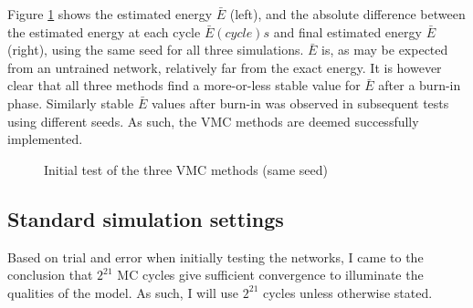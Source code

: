 \documentclass[%
oneside,                 %
final,                   %
10pt]{article}
\begin{document}
Figure \ref{fig:inital_1} shows the estimated energy $\bar E$ (left), and the absolute difference between the estimated energy at each cycle $\bar E(cycle)s$ and final estimated energy $\bar E$ (right), using the same seed for all three simulations. $\bar E$ is, as may be expected from an untrained network, relatively far from the exact energy. It is however clear that all three methods find a more-or-less stable value for $\bar E$ after a burn-in phase.  Similarly stable $\bar E$ values after burn-in was observed in subsequent tests using different seeds. As such, the VMC methods are deemed successfully implemented.
	\begin{figure}[H]
		\centering
		\caption{Initial test of the three VMC methods (same seed)}
		   \label{fig:inital_1}   
	\end{figure}


\subsection{Standard simulation settings}
Based on trial and error when initially testing the networks, I came to the conclusion that $2^{21}$ MC cycles give sufficient convergence to illuminate the qualities of the model. As such, I will use $2^{21}$ cycles unless otherwise stated.
\end{document}
